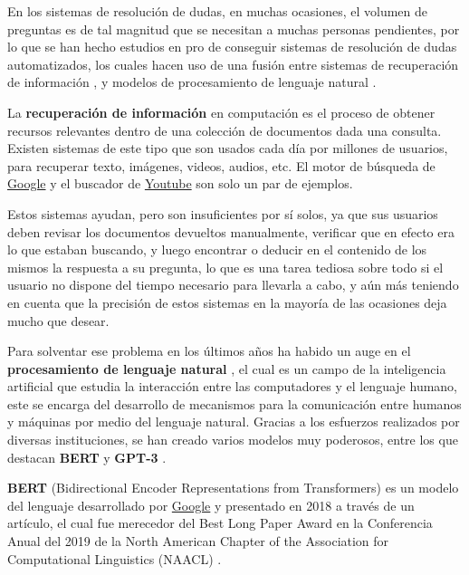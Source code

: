 En los sistemas de resolución de dudas, en muchas ocasiones, el volumen de preguntas es de tal magnitud que se necesitan a muchas personas pendientes, por lo que se han hecho estudios en pro de conseguir sistemas de resolución de dudas automatizados, los cuales hacen uso de una fusión entre sistemas de recuperación de información \cite{ir}, y modelos de procesamiento de lenguaje natural \cite{nlp}.
\newline

La \textbf{recuperación de información} \cite{ir} en computación es el proceso de obtener recursos relevantes dentro de una colección de documentos dada una consulta. Existen sistemas de este tipo que son usados cada día por millones de usuarios, para recuperar texto, imágenes, videos, audios, etc. El motor de búsqueda de \href{google.com}{Google} y el buscador de \href{youtube.com}{Youtube} son solo un par de ejemplos.
\newline

Estos sistemas ayudan, pero son insuficientes por sí solos, ya que sus usuarios deben revisar los documentos devueltos manualmente, verificar que en efecto era lo que estaban buscando, y luego encontrar o deducir en el contenido de los mismos la respuesta a su pregunta, lo que es una tarea tediosa sobre todo si el usuario no dispone del tiempo necesario para llevarla a cabo, y aún más teniendo en cuenta que la precisión de estos sistemas en la mayoría de las ocasiones deja mucho que desear.
\newline

Para solventar ese problema en los últimos años ha habido un auge en el \textbf{procesamiento de lenguaje natural} \cite{nlp}, el cual es un campo de la inteligencia artificial que estudia la interacción entre las computadores y el lenguaje humano, este se encarga del desarrollo de mecanismos para la comunicación entre humanos y máquinas por medio del lenguaje natural. Gracias a los esfuerzos realizados por diversas instituciones, se han creado varios modelos muy poderosos, entre los que destacan \textbf{BERT} \cite{bert} y \textbf{GPT-3} \cite{gpt}.
\newline

\textbf{BERT} (Bidirectional Encoder Representations from Transformers) es un modelo del lenguaje desarrollado por \href{google.com}{Google} y presentado en 2018 a través de un artículo, el cual fue merecedor del Best Long Paper
Award en la Conferencia Anual del 2019 de la North American Chapter of the Association for Computational Linguistics (NAACL) \cite{bert_award}.
\newline

